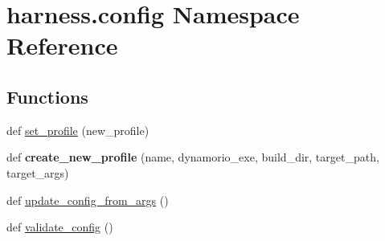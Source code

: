 \hypertarget{namespaceharness_1_1config}{}\section{harness.\+config Namespace Reference}
\label{namespaceharness_1_1config}
\subsection*{Functions}
\begin{DoxyCompactItemize}
\item 
def \mbox{\hyperlink{namespaceharness_1_1config_a76d6ca110a588f9fc5a9148f7cad031a}{set\+\_\+profile}} (new\+\_\+profile)
\item 
\mbox{\label{namespaceharness_1_1config_a43a3af2e3dff66d86b8867244008f1e4}} 
def {\bfseries create\+\_\+new\+\_\+profile} (name, dynamorio\+\_\+exe, build\+\_\+dir, target\+\_\+path, target\+\_\+args)
\item 
def \mbox{\hyperlink{namespaceharness_1_1config_af973468652776588816fd0796be0f49b}{update\+\_\+config\+\_\+from\+\_\+args}} ()
\item 
def \mbox{\hyperlink{namespaceharness_1_1config_a372fafd2683cb16e932d6e9ffbf57a54}{validate\+\_\+config}} ()
\end{DoxyCompactItemize}
